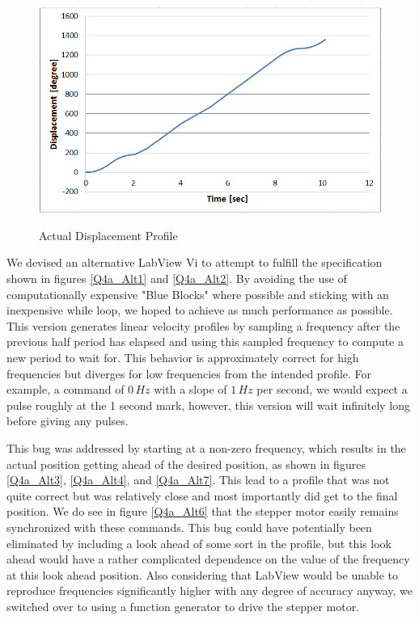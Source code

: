 \documentclass{article}
\theoremstyle{plain}
\theoremstyle{definition}
\theoremstyle{remark}
\begin{document}
\begin{figure}[h!]
\begin{center}
\includegraphics[width=12cm]{Q4_Trapezoid_Displacement_Fail.png}
\caption{Actual Displacement Profile} \label{tex}
\label{fig:q4_4}
\end{center}
\end{figure}


\clearpage

We devised an alternative LabView Vi to attempt to fulfill the specification shown in figures \ref{Q4a_Alt1} and \ref{Q4a_Alt2}.  By avoiding the use of computationally expensive "Blue Blocks" where possible and sticking with an inexpensive while loop, we hoped to achieve as much performance as possible.  This version generates linear velocity profiles by sampling a frequency after the previous half period has elapsed and using this sampled frequency to compute a new period to wait for.  This behavior is approximately correct for high frequencies but diverges for low frequencies from the intended profile.  For example, a command of $0 \, Hz$ with a slope of $1 \, Hz$ per second, we would expect a pulse roughly at the 1 second mark, however, this version will wait infinitely long before giving any pulses.  

This bug was addressed by starting at a non-zero frequency, which results in the actual position getting ahead of the desired position, as shown in figures \ref{Q4a_Alt3}, \ref{Q4a_Alt4}, and \ref{Q4a_Alt7}.  This lead to a profile that was not quite correct but was relatively close and most importantly did get to the final position.  We do see in figure \ref{Q4a_Alt6} that the stepper motor easily remains synchronized with these commands.  This bug could have potentially been eliminated by including a look ahead of some sort in the profile, but this look ahead would have a rather complicated dependence on the value of the frequency at this look ahead position.  Also considering that LabView would be unable to reproduce frequencies significantly higher with any degree of accuracy anyway, we switched over to using a function generator to drive the stepper motor.
\end{document}
